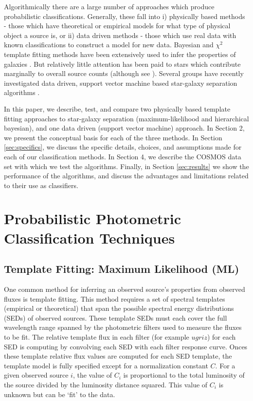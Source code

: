 \documentclass[12pt,preprint]{aastex}
\begin{document}
Algorithmically there are a large number of approaches which produce
probabilistic classifications.  Generally, these fall into i)
physically based methods - those which have theoretical or empirical
models for what type of physical object a source is, or ii) data
driven methods - those which use real data with known classifications
to construct a model for new data.  Bayesian and $\chi^2$ template
fitting methods have been extensively used to infer the properties of
galaxies \citep[e.g.][]{coil04a, ilbert09, xia09,
  walcher11a,hildebrandt10}. But relatively little attention has been
paid to stars which contribute marginally to overall source counts
(although see \citealt{robin07}).  Several groups have recently
investigated data driven, support vector machine based star-galaxy
separation algorithms \citep[e.g.][]{saglia12,solarz12a,tsalmantza12a}.

In this paper, we describe, test, and compare two physically based
template fitting approaches to star-galaxy separation
(maximum-likelihood and hierarchical bayesian), and one data driven
(support vector machine) approach.  In Section 2, we present the
conceptual basis for each of the three methods.  In Section
\ref{sec:specifics}, we discuss the specific details, choices, and
assumptions made for each of our classification methods.  In Section
4, we describe the COSMOS data set with which we test the algorithms.
Finally, in Section \ref{sec:results} we show the performance of the
algorithms, and discuss the advantages and limitations related to
their use as classifiers.


%
%
\section{Probabilistic Photometric Classification Techniques}

\subsection{Template Fitting: Maximum Likelihood (ML)}
\label{ssec:MLmethod}

One common method for inferring an observed source's properties from
observed fluxes is template fitting.  This method requires a set of
spectral templates (empirical or theoretical) that span the possible
spectral energy distributions (SEDs) of observed sources.  These
template SEDs must each cover the full wavelength range spanned by the
photometric filters used to measure the fluxes to be fit.  The
relative template flux in each filter (for example $ugriz$) for each
SED is computing by convolving each SED with each filter response
curve.  Onces these template relative flux values are computed for
each SED template, the template model is fully specified except for a
normalization constant $C$.  For a given observed source $i$, the
value of $C_i$ is proportional to the total luminosity of the source
divided by the luminosity distance squared.  This value of $C_i$ is
unknown but can be `fit' to the data.
\end{document}
